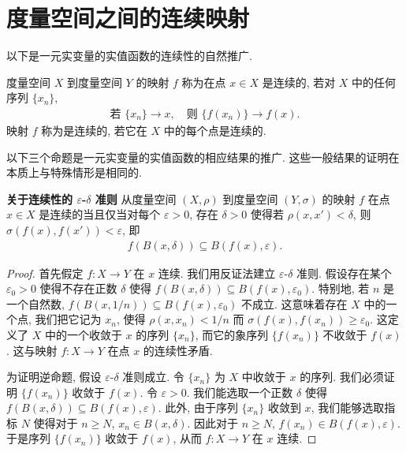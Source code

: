 \documentclass[../../main.tex]{subfiles}
\begin{document}
\section{度量空间之间的连续映射}\label{section:ch09-连续映射}

以下是一元实变量的实值函数的连续性的自然推广.

\begin{definition}[连续映射]\label{definition:ch09-连续映射}
度量空间 $X$ 到度量空间 $Y$ 的映射 $f$ 称为在点 $x\in X$ 是连续的, 若对 $X$ 中的任何序列 $\{x_{n}\}$,
\begin{align*}
\text{若 }\{x_{n}\}\to x,\quad\text{则 }\{f(x_{n})\}\to f(x).
\end{align*}
映射 $f$ 称为是连续的, 若它在 $X$ 中的每个点是连续的.
\end{definition}

以下三个命题是一元实变量的实值函数的相应结果的推广. 这些一般结果的证明在本质上与特殊情形是相同的.

\textbf{关于连续性的 $\varepsilon$-$\delta$ 准则} 从度量空间 $(X,\rho)$ 到度量空间 $(Y,\sigma)$ 的映射 $f$ 在点 $x\in X$ 是连续的当且仅当对每个 $\varepsilon>0$, 存在 $\delta>0$ 使得若 $\rho(x,x')<\delta$, 则 $\sigma(f(x),f(x'))<\varepsilon$, 即
\begin{align*}
f(B(x,\delta))\subseteq B(f(x),\varepsilon).
\end{align*}

\begin{proof}
首先假定 $f:X\to Y$ 在 $x$ 连续. 我们用反证法建立 $\varepsilon$-$\delta$ 准则. 假设存在某个 $\varepsilon_{0}>0$ 使得不存在正数 $\delta$ 使得 $f(B(x,\delta))\subseteq B(f(x),\varepsilon_{0})$. 特别地, 若 $n$ 是一个自然数, $f(B(x,1/n))\subseteq B(f(x),\varepsilon_{0})$ 不成立. 这意味着存在 $X$ 中的一个点, 我们把它记为 $x_{n}$, 使得 $\rho(x,x_{n})<1/n$ 而 $\sigma(f(x),f(x_{n}))\geqslant\varepsilon_{0}$. 这定义了 $X$ 中的一个收敛于 $x$ 的序列 $\{x_{n}\}$, 而它的象序列 $\{f(x_{n})\}$ 不收敛于 $f(x)$. 这与映射 $f:X\to Y$ 在点 $x$ 的连续性矛盾.

为证明逆命题, 假设 $\varepsilon$-$\delta$ 准则成立. 令 $\{x_{n}\}$ 为 $X$ 中收敛于 $x$ 的序列. 我们必须证明 $\{f(x_{n})\}$ 收敛于 $f(x)$. 令 $\varepsilon>0$. 我们能选取一个正数 $\delta$ 使得 $f(B(x,\delta))\subseteq B(f(x),\varepsilon)$. 此外, 由于序列 $\{x_{n}\}$ 收敛到 $x$, 我们能够选取指标 $N$ 使得对于 $n\geqslant N$, $x_{n}\in B(x,\delta)$. 因此对于 $n\geqslant N$, $f(x_{n})\in B(f(x),\varepsilon)$. 于是序列 $\{f(x_{n})\}$ 收敛于 $f(x)$, 从而 $f:X\to Y$ 在 $x$ 连续.
\end{proof}
\end{document}
